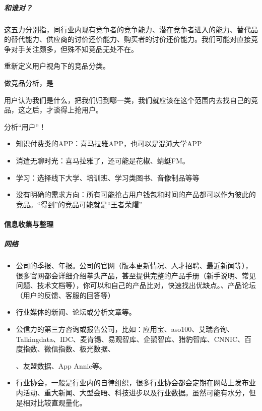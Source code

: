 \documentclass[letterpaper,10pt,english]{sphinxmanual}
\begin{document}
\subparagraph{和谁对？}
\label{\detokenize{chapter_knowledge/goods_analysis:id11}}
这五力分别指，同行业内现有竞争者的竞争能力、潜在竞争者进入的能力、替代品的替代能力、供应商的讨价还价能力、购买者的讨价还价能力。我们可能对直接竞争对手关注颇多，但殊不知竞品无处不在。

重新定义用户视角下的竞品分类。

做竞品分析，是

用户认为我们是什么，把我们归到哪一类，我们就应该在这个范围内去找自己的竞品，这之后，才谈得上抢用户。

分析“用户”！
\begin{itemize}
\item {} 
知识付费类的APP：喜马拉雅APP，也可以是混沌大学APP

\item {} 
消遣无聊时光：喜马拉雅了，还可能是花椒、蜻蜓FM。

\item {} 
学习：选择线下大学、培训班、学习类图书、音像制品等等

\item {} 
没有明确的需求方向：所有可能抢占用户钱包和时间的产品都可以作为彼此的竞品。“得到”的竞品可能就是“王者荣耀”

\end{itemize}


\paragraph{信息收集与整理}
\label{\detokenize{chapter_knowledge/goods_analysis:id12}}

\subparagraph{网络}
\label{\detokenize{chapter_knowledge/goods_analysis:id13}}\begin{itemize}
\item {} 
公司的季报、年报。公司的官网（版本更新情况、人才招聘、最近新闻等），很多官网都会详细介绍拳头产品，甚至提供完整的产品手册（新手说明、常见问题、技术文档等），你可以和自己的产品比对，快速找出优缺点。、产品论坛（用户的反馈、客服的回答等）

\item {} 
行业媒体的新闻、论坛或分析文章等。

\item {} 
公信力的第三方咨询或报告公司，比如：应用宝、aso100、艾瑞咨询、Talkingdata、IDC、麦肯锡、易观智库、企鹅智库、猎豹智库、CNNIC、百度指数、微信指数、极光数据、%
\begin{footnote}[526]\sphinxAtStartFootnote
{}
%
\end{footnote}、友盟数据、App
Annie等。

\item {} 
行业协会，一般是行业内的自律组织，很多行业协会都会定期在网站上发布业内活动、重大新闻、大型会晤、科技进步以及行业数据。虽然可能有水分，但是相对比较直观量化。

\end{itemize}
\end{document}
